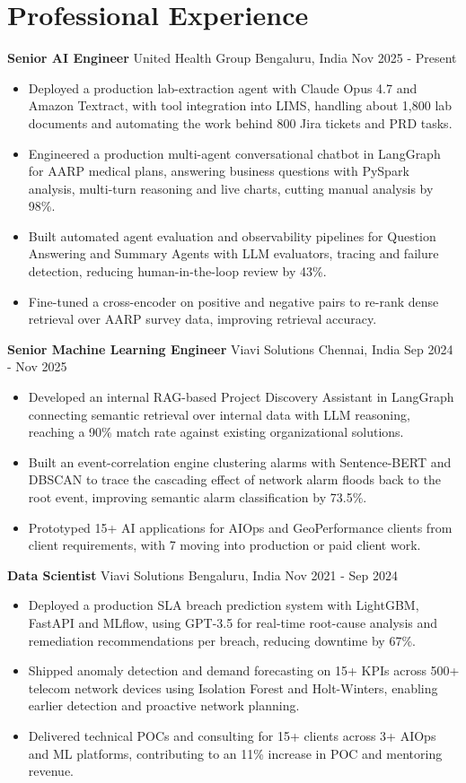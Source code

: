 \documentclass[10pt,a4paper]{article}
\newcommand{\role}[4]{\textbf{#1} \textbar{} #2 \hfill #3 \textbar{} #4\par}
\begin{document}
\section{Professional Experience}
\role{Senior AI Engineer}{United Health Group}{Bengaluru, India}{Nov 2025 - Present}
\begin{itemize}
  \item Deployed a production lab-extraction agent with Claude Opus 4.7 and Amazon Textract, with tool integration into LIMS, handling about 1,800 lab documents and automating the work behind 800 Jira tickets and PRD tasks.
  \item Engineered a production multi-agent conversational chatbot in LangGraph for AARP medical plans, answering business questions with PySpark analysis, multi-turn reasoning and live charts, cutting manual analysis by 98\%.
  \item Built automated agent evaluation and observability pipelines for Question Answering and Summary Agents with LLM evaluators, tracing and failure detection, reducing human-in-the-loop review by 43\%.
  \item Fine-tuned a cross-encoder on positive and negative pairs to re-rank dense retrieval over AARP survey data, improving retrieval accuracy.
\end{itemize}
\vspace{3pt}
\role{Senior Machine Learning Engineer}{Viavi Solutions}{Chennai, India}{Sep 2024 - Nov 2025}
\begin{itemize}
  \item Developed an internal RAG-based Project Discovery Assistant in LangGraph connecting semantic retrieval over internal data with LLM reasoning, reaching a 90\% match rate against existing organizational solutions.
  \item Built an event-correlation engine clustering alarms with Sentence-BERT and DBSCAN to trace the cascading effect of network alarm floods back to the root event, improving semantic alarm classification by 73.5\%.
  \item Prototyped 15+ AI applications for AIOps and GeoPerformance clients from client requirements, with 7 moving into production or paid client work.
\end{itemize}
\vspace{3pt}
\role{Data Scientist}{Viavi Solutions}{Bengaluru, India}{Nov 2021 - Sep 2024}
\begin{itemize}
  \item Deployed a production SLA breach prediction system with LightGBM, FastAPI and MLflow, using GPT-3.5 for real-time root-cause analysis and remediation recommendations per breach, reducing downtime by 67\%.
  \item Shipped anomaly detection and demand forecasting on 15+ KPIs across 500+ telecom network devices using Isolation Forest and Holt-Winters, enabling earlier detection and proactive network planning.
  \item Delivered technical POCs and consulting for 15+ clients across 3+ AIOps and ML platforms, contributing to an 11\% increase in POC and mentoring revenue.
\end{itemize}
\end{document}
